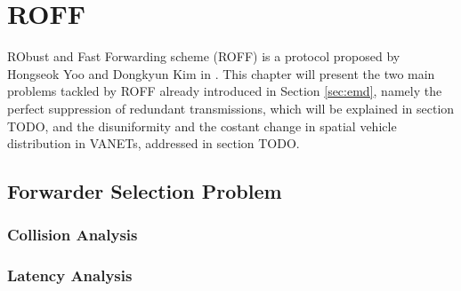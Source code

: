 
\chapter{ROFF}
\label{chapter:roff}

RObust and Fast Forwarding scheme (ROFF) is a protocol proposed by Hongseok Yoo and Dongkyun Kim in \cite{6906275}. This chapter will present the two main problems tackled by ROFF already introduced in Section \ref{sec:emd}, namely the perfect suppression of redundant transmissions, which will be explained in section TODO, and the disuniformity and the costant change in spatial vehicle distribution in VANETs, addressed in section TODO.

	\section{Forwarder Selection Problem}
		\subsection{Collision Analysis}
		\label{ssec:collision-analysis}
		
		\subsection{Latency Analysis}
		\label{ssec:latency-analysis}